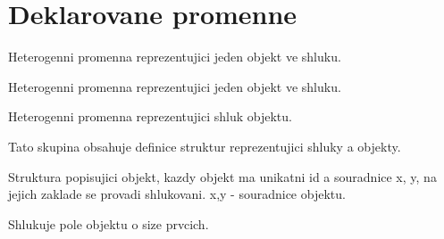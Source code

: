 \hypertarget{group__Promenne}{}\section{Deklarovane promenne}
\label{group__Promenne}


Heterogenni promenna reprezentujici jeden objekt ve shluku.  


Heterogenni promenna reprezentujici jeden objekt ve shluku. 

Heterogenni promenna reprezentujici shluk objektu.

Tato skupina obsahuje definice struktur reprezentujici shluky a objekty.

Struktura popisujici objekt, kazdy objekt ma unikatni \textquotesingle{}id\textquotesingle{} a souradnice \textquotesingle{}x\textquotesingle{}, \textquotesingle{}y\textquotesingle{}, na jejich zaklade se provadi shlukovani. x,y -\/ souradnice objektu.

Shlukuje pole objektu o \textquotesingle{}size\textquotesingle{} prvcich. 
